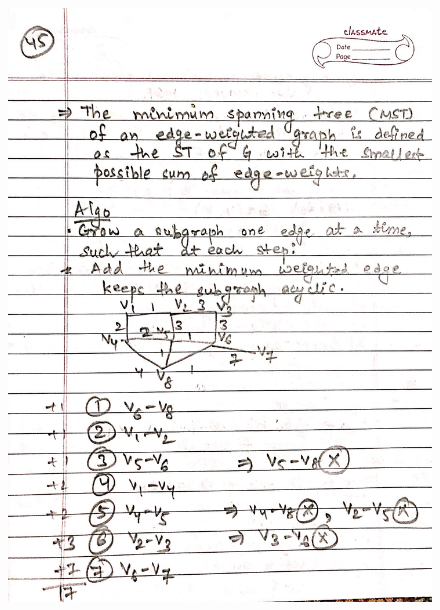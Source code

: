 \begin{figure}[H]
    \centering
    \includegraphics[scale=0.25]{"./MIT-6.042J/MIT-6042J-045"}
\end{figure}
\newpage

